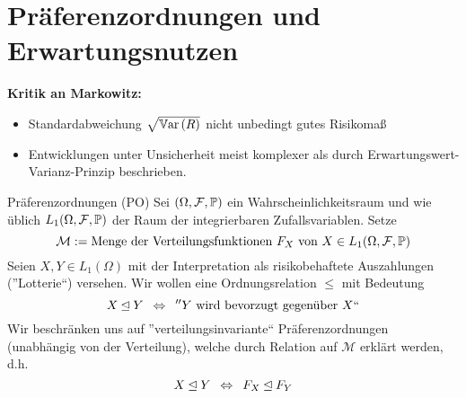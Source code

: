 \section{Präferenzordnungen und Erwartungsnutzen}

\textbf{Kritik an Markowitz:}
\begin{itemize}[nolistsep, topsep=-\parskip]
	\item Standardabweichung $\sqrt{\Var[R]}$ nicht unbedingt gutes Risikomaß
	\item Entwicklungen unter Unsicherheit meist komplexer als durch Erwartungswert-Varianz-Prinzip beschrieben.
\end{itemize}

\vspace{\parskip}

 Präferenzordnungen (PO)
Sei $(\Omega, \F, \P)$ ein Wahrscheinlichkeitsraum und wie üblich $L_1(\Omega, \F, \P)$ der Raum der integrierbaren Zufallsvariablen. Setze
\begin{equation*}
	\mathcal{M} \defeq \text{Menge der Verteilungsfunktionen } F_X \text{ von } X \in L_1(\Omega, \F, \P)
\end{equation*}
Seien $X,Y \in L_1(\Omega)$ mit der Interpretation als risikobehaftete Auszahlungen (''Lotterie``) versehen. Wir wollen eine Ordnungsrelation $\leqslant$ mit Bedeutung
\begin{equation*}
	X \unlhd Y \equivalent ''Y \text{ wird bevorzugt gegenüber } X``
\end{equation*}
Wir beschränken uns auf ''verteilungsinvariante`` Präferenzordnungen (unabhängig von der Verteilung), welche durch Relation auf $\mathcal{M}$ erklärt werden, d.h.
\begin{equation*}
	X \unlhd Y \equivalent F_X \unlhd F_Y
\end{equation*}

